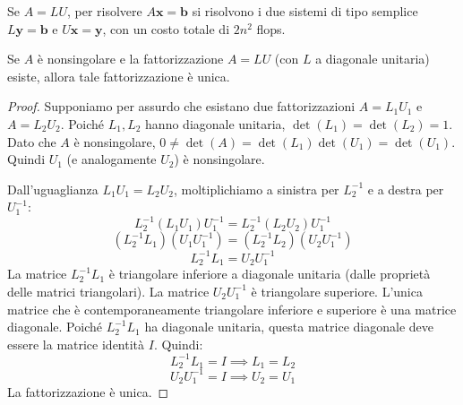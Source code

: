 \begin{osservazione}
Se $A=LU$, per risolvere $A\mathbf{x}=\mathbf{b}$ si risolvono i due sistemi di tipo semplice $L\mathbf{y}=\mathbf{b}$ e $U\mathbf{x}=\mathbf{y}$, con un costo totale di $2n^2$ flops.
\end{osservazione}

\begin{teorema}
Se $A$ è nonsingolare e la fattorizzazione $A=LU$ (con $L$ a diagonale unitaria) esiste, allora tale fattorizzazione è unica.
\end{teorema}
\begin{proof}
Supponiamo per assurdo che esistano due fattorizzazioni $A = L_1 U_1$ e $A = L_2 U_2$.
Poiché $L_1, L_2$ hanno diagonale unitaria, $\det(L_1) = \det(L_2) = 1$.
Dato che $A$ è nonsingolare, $0 \neq \det(A) = \det(L_1)\det(U_1) = \det(U_1)$. Quindi $U_1$ (e analogamente $U_2$) è nonsingolare.

Dall'uguaglianza $L_1 U_1 = L_2 U_2$, moltiplichiamo a sinistra per $L_2^{-1}$ e a destra per $U_1^{-1}$:
$$ L_2^{-1} (L_1 U_1) U_1^{-1} = L_2^{-1} (L_2 U_2) U_1^{-1} $$
$$ (L_2^{-1} L_1) (U_1 U_1^{-1}) = (L_2^{-1} L_2) (U_2 U_1^{-1}) $$
$$ L_2^{-1} L_1 = U_2 U_1^{-1} $$
La matrice $L_2^{-1} L_1$ è triangolare inferiore a diagonale unitaria (dalle proprietà delle matrici triangolari).
La matrice $U_2 U_1^{-1}$ è triangolare superiore.
L'unica matrice che è contemporaneamente triangolare inferiore e superiore è una matrice diagonale. Poiché $L_2^{-1} L_1$ ha diagonale unitaria, questa matrice diagonale deve essere la matrice identità $I$.
Quindi:
$$ L_2^{-1} L_1 = I \implies L_1 = L_2 $$
$$ U_2 U_1^{-1} = I \implies U_2 = U_1 $$
La fattorizzazione è unica.
\end{proof}

